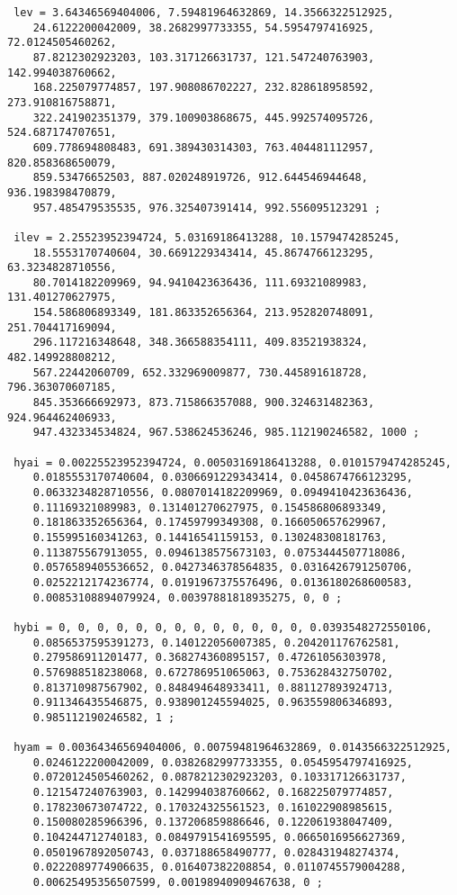 \documentclass[times,doublespace]{fldauth}
\begin{document}
{\begin{appendix}
\begin{verbatim}
 lev = 3.64346569404006, 7.59481964632869, 14.3566322512925, 
    24.6122200042009, 38.2682997733355, 54.5954797416925, 72.0124505460262, 
    87.8212302923203, 103.317126631737, 121.547240763903, 142.994038760662, 
    168.225079774857, 197.908086702227, 232.828618958592, 273.910816758871, 
    322.241902351379, 379.100903868675, 445.992574095726, 524.687174707651, 
    609.778694808483, 691.389430314303, 763.404481112957, 820.858368650079, 
    859.53476652503, 887.020248919726, 912.644546944648, 936.198398470879, 
    957.485479535535, 976.325407391414, 992.556095123291 ;

 ilev = 2.25523952394724, 5.03169186413288, 10.1579474285245, 
    18.5553170740604, 30.6691229343414, 45.8674766123295, 63.3234828710556, 
    80.7014182209969, 94.9410423636436, 111.69321089983, 131.401270627975, 
    154.586806893349, 181.863352656364, 213.952820748091, 251.704417169094, 
    296.117216348648, 348.366588354111, 409.83521938324, 482.149928808212, 
    567.22442060709, 652.332969009877, 730.445891618728, 796.363070607185, 
    845.353666692973, 873.715866357088, 900.324631482363, 924.964462406933, 
    947.432334534824, 967.538624536246, 985.112190246582, 1000 ;

 hyai = 0.00225523952394724, 0.00503169186413288, 0.0101579474285245, 
    0.0185553170740604, 0.0306691229343414, 0.0458674766123295, 
    0.0633234828710556, 0.0807014182209969, 0.0949410423636436, 
    0.11169321089983, 0.131401270627975, 0.154586806893349, 
    0.181863352656364, 0.17459799349308, 0.166050657629967, 
    0.155995160341263, 0.14416541159153, 0.130248308181763, 
    0.113875567913055, 0.0946138575673103, 0.0753444507718086, 
    0.0576589405536652, 0.0427346378564835, 0.0316426791250706, 
    0.0252212174236774, 0.0191967375576496, 0.0136180268600583, 
    0.00853108894079924, 0.00397881818935275, 0, 0 ;

 hybi = 0, 0, 0, 0, 0, 0, 0, 0, 0, 0, 0, 0, 0, 0.0393548272550106, 
    0.0856537595391273, 0.140122056007385, 0.204201176762581, 
    0.279586911201477, 0.368274360895157, 0.47261056303978, 
    0.576988518238068, 0.672786951065063, 0.753628432750702, 
    0.813710987567902, 0.848494648933411, 0.881127893924713, 
    0.911346435546875, 0.938901245594025, 0.963559806346893, 
    0.985112190246582, 1 ;

 hyam = 0.00364346569404006, 0.00759481964632869, 0.0143566322512925, 
    0.0246122200042009, 0.0382682997733355, 0.0545954797416925, 
    0.0720124505460262, 0.0878212302923203, 0.103317126631737, 
    0.121547240763903, 0.142994038760662, 0.168225079774857, 
    0.178230673074722, 0.170324325561523, 0.161022908985615, 
    0.150080285966396, 0.137206859886646, 0.122061938047409, 
    0.104244712740183, 0.0849791541695595, 0.0665016956627369, 
    0.0501967892050743, 0.037188658490777, 0.028431948274374, 
    0.0222089774906635, 0.016407382208854, 0.0110745579004288, 
    0.00625495356507599, 0.00198940909467638, 0 ;


\end{verbatim}
\end{appendix}}
\end{document}
